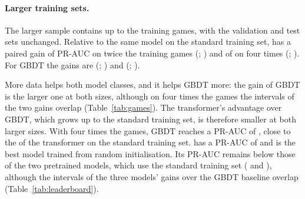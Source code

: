 \documentclass[11pt]{article}
\begin{document}
\paragraph{Larger training sets.}
The larger sample contains up to  the training games,
with the validation and test sets unchanged. Relative to the same model on
the standard training set,  has a paired gain of
 PR-AUC
on twice the training games
(;
) and of
 on
four times
(;
).
For GBDT the gains are 
(;
) and
(;
).

More data helps both model classes, and it helps GBDT more: the gain of GBDT
is the larger one at both sizes, although on four times the games the
intervals of the two gains overlap (Table~\ref{tab:games}). The transformer's
advantage over GBDT, which grows up to the standard training set, is
therefore smaller at both larger sizes. With four times the games, GBDT
reaches a PR-AUC of
, close to the
 of the transformer on the standard
training set.  has a PR-AUC of
 and is the best model
trained from random initialisation.
\ifchangestart
Its PR-AUC remains below those of the two pretrained models, which use the
standard training set ( and
), although the intervals of
the three models' gains over the GBDT baseline overlap
(Table~\ref{tab:leaderboard}).
\fi
\end{document}
